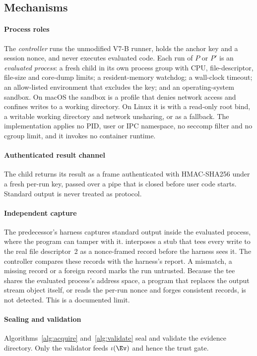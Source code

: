 \subsection{Mechanisms}
\paragraph*{Process roles} The \emph{controller} runs the unmodified V7-B runner, holds the anchor key and a session nonce, and never executes evaluated code. Each run of $P$ or $P'$ is an \emph{evaluated process}: a fresh child in its own process group with CPU, file-descriptor, file-size and core-dump limits; a resident-memory watchdog; a wall-clock timeout; an allow-listed environment that excludes the key; and an operating-system sandbox. On macOS the sandbox is a  profile that denies network access and confines writes to a working directory. On Linux it is  with a read-only root bind, a writable working directory and network unsharing, or  as a fallback. The implementation applies no PID, user or IPC namespace, no seccomp filter and no cgroup limit, and it invokes no container runtime.

\paragraph*{Authenticated result channel} The child returns its result as a frame authenticated with HMAC-SHA256 under a fresh per-run key, passed over a pipe that is closed before user code starts. Standard output is never treated as protocol.

\paragraph*{Independent capture} The predecessor's harness captures standard output inside the evaluated process, where the program can tamper with it. \sbg{} interposes a stub that tees every write to the real file descriptor~2 as a nonce-framed record before the harness sees it. The controller compares these records with the harness's report. A mismatch, a missing record or a foreign record marks the run untrusted. Because the tee shares the evaluated process's address space, a program that replaces the output stream object itself, or reads the per-run nonce and forges consistent records, is not detected. This is a documented limit.

\paragraph*{Sealing and validation} Algorithms~\ref{alg:acquire} and~\ref{alg:validate} seal and validate the evidence directory. Only the validator feeds $\iota(\Ev)$ and hence the trust gate.

